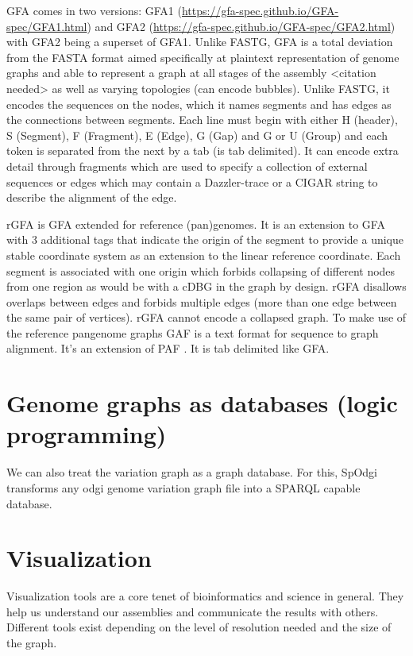 \documentclass[11pt]{article}
\begin{document}
GFA \cite{liMinimapMiniasmFast2016} comes in two versions:
GFA1 (\url{https://gfa-spec.github.io/GFA-spec/GFA1.html}) and
GFA2 (\url{https://gfa-spec.github.io/GFA-spec/GFA2.html}) with GFA2 being a superset
of GFA1. 
Unlike FASTG, GFA is a total deviation from the FASTA format aimed specifically 
at plaintext representation of genome graphs and able to represent a graph at 
all stages of the assembly <citation needed> as well as varying topologies
(can encode bubbles).
Unlike FASTG, it encodes the sequences on the nodes, which it names segments and
has edges as the connections between segments. 
Each line must begin with either H (header), S (Segment), F (Fragment), E (Edge),
G (Gap) and G or U (Group) and each token is separated from the next by a tab
(is tab delimited). 
It can encode extra detail through fragments which are used to specify a
collection of external sequences or edges which may contain a Dazzler-trace or
a CIGAR string to describe the alignment of the edge.

rGFA \cite{liDesignConstructionReference2020} is GFA extended for reference 
(pan)genomes. It is an extension
to GFA with 3 additional tags that indicate the origin of the segment to
provide a unique stable coordinate system as an extension to the linear 
reference coordinate. Each segment is associated with one origin which forbids
collapsing of different nodes from one region as would be with a cDBG  in the
graph by design. rGFA disallows overlaps between edges and forbids multiple
edges (more than one edge between the same pair of vertices).
rGFA cannot encode a collapsed graph.
To make use of the reference pangenome graphs 
GAF \cite{liDesignConstructionReference2020} is a text format 
for sequence to graph alignment.
It’s an extension of PAF \cite{liMinimapMiniasmFast2016}. 
It is tab delimited like GFA. 

\section{Genome graphs as databases (logic programming)}
\label{sec:org7793e16}
We can also treat the variation graph as a graph database. For this, SpOdgi 
 transforms any odgi genome variation graph file into a
SPARQL capable database.

\section{Visualization}
\label{sec:orgb5c4b19}
Visualization tools are a core tenet of bioinformatics and science in general.
They help us understand our assemblies and communicate the results with others. 
Different tools exist depending on the level of resolution needed and 
the size of the graph. 
\end{document}
